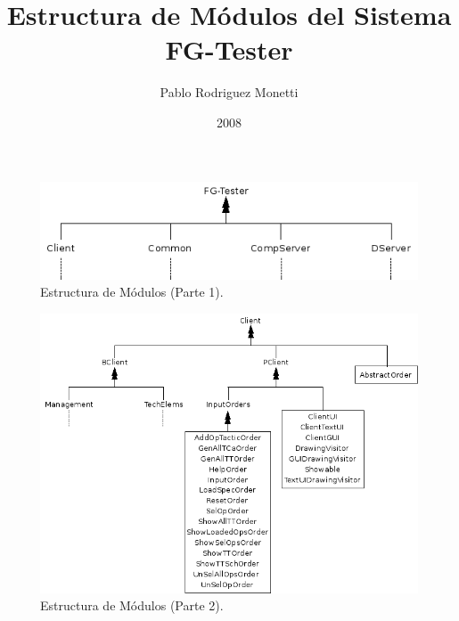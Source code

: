 \documentclass[a4paper,11pt]{article}
\title{Estructura de Módulos del Sistema FG-Tester}
\date{2008}
\author{Pablo Rodriguez Monetti}
\begin{document}
 
\maketitle

\newpage


\begin{figure}
\begin{center}
\includegraphics[scale=0.6]{./EstrucModulos01.png}
\end{center}
\caption{Estructura de Módulos (Parte 1).}
\end{figure}


\begin{figure}
\begin{center}
\includegraphics[scale=0.6]{./EstrucModulos02.png}
\end{center}
\caption{Estructura de Módulos (Parte 2).}
\end{figure}
\end{document}
